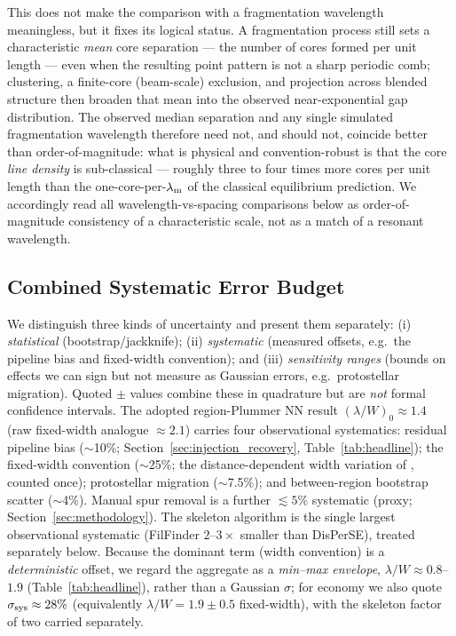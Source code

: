 \documentclass[usenatbib,twoside,twocolumn]{mnras}
\begin{document}
This does not make the comparison with a fragmentation wavelength meaningless, but it fixes its logical status. A fragmentation process still sets a characteristic \emph{mean} core separation --- the number of cores formed per unit length --- even when the resulting point pattern is not a sharp periodic comb; clustering, a finite-core (beam-scale) exclusion, and projection across blended structure then broaden that mean into the observed near-exponential gap distribution. The observed median separation and any single simulated fragmentation wavelength therefore need not, and should not, coincide better than order-of-magnitude: what is physical and convention-robust is that the core \emph{line density} is sub-classical --- roughly three to four times more cores per unit length than the one-core-per-$\lambda_{\rm m}$ of the classical equilibrium prediction. We accordingly read all wavelength-vs-spacing comparisons below as order-of-magnitude consistency of a characteristic scale, not as a match of a resonant wavelength.

\subsection{Combined Systematic Error Budget}
\label{sec:error_budget}

We distinguish three kinds of uncertainty and present them separately: (i) \emph{statistical} (bootstrap/jackknife); (ii) \emph{systematic} (measured offsets, e.g.\ the pipeline bias and fixed-width convention); and (iii) \emph{sensitivity ranges} (bounds on effects we can sign but not measure as Gaussian errors, e.g.\ protostellar migration). Quoted $\pm$ values combine these in quadrature but are \emph{not} formal confidence intervals. The adopted region-Plummer NN result $(\lambda/W)_0\approx1.4$ (raw fixed-width analogue $\approx2.1$) carries four observational systematics: residual pipeline bias ($\sim$10\%; Section~\ref{sec:injection_recovery}, Table~\ref{tab:headline}); the fixed-width convention ($\sim$25\%; the distance-dependent width variation of \citealt{Panopoulou2022}, counted once); protostellar migration ($\sim$7.5\%); and between-region bootstrap scatter ($\sim$4\%). Manual spur removal is a further $\lesssim5\%$ systematic (proxy; Section~\ref{sec:methodology}). The skeleton algorithm is the single largest observational systematic (FilFinder $2$--$3\times$ smaller than DisPerSE), treated separately below. Because the dominant term (width convention) is a \emph{deterministic} offset, we regard the aggregate as a \emph{min--max envelope}, $\lambda/W\approx0.8$--$1.9$ (Table~\ref{tab:headline}), rather than a Gaussian $\sigma$; for economy we also quote $\sigma_{\rm sys}\approx28\%$ (equivalently $\lambda/W=1.9\pm0.5$ fixed-width), with the skeleton factor of two carried separately.
\end{document}
